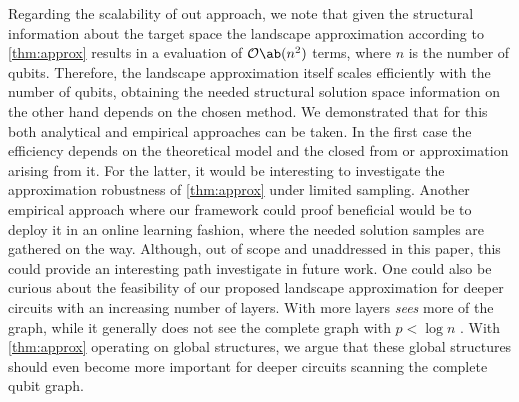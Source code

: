 Regarding the scalability of out approach, we note that given the structural information about the target space the landscape approximation according to \cref{thm:approx} results in a evaluation of $\mathcal{O}\ab(n^2)$ terms, where $n$ is the number of qubits. Therefore, the landscape approximation itself scales efficiently with the number of qubits, obtaining the needed structural solution space information on the other hand depends on the chosen method. We demonstrated  that for this both analytical and empirical approaches can be taken. In the first case the efficiency depends on the theoretical model and the closed from or approximation arising from it. For the latter, it would be interesting to investigate the approximation robustness of \ref{thm:approx} under limited sampling. Another empirical approach where our framework could proof beneficial would be to deploy it in an online learning fashion, where the needed solution samples are gathered on the way. Although, out of scope and unaddressed in this paper, this could provide an interesting path investigate in future work. One could also be curious about the feasibility of our proposed landscape approximation for deeper circuits with an increasing number of layers. With more layers \QAOA \emph{sees} more of the graph, while it generally does not see the complete graph with $p < \log n$ \cite{farhi2020quantum,farhi2020quantumTypcal}. With \cref{thm:approx} operating on global structures, we argue that these global structures should even become more important for deeper \QAOA circuits scanning the complete qubit graph. 
 
